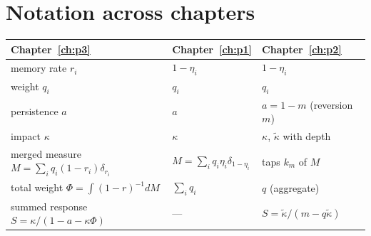 \section{Notation across chapters}

\begin{longtable}{p{}p{}p{}}
\toprule
Chapter~\ref{ch:p3} & Chapter~\ref{ch:p1} & Chapter~\ref{ch:p2}\\
\midrule
memory rate $r_i$ & $1-\eta_i$ & $1-\eta_i$\\
weight $q_i$ & $q_i$ & $q_i$\\
persistence $a$ & $a$ & $a=1-m$ (reversion $m$)\\
impact $\kappa$ & $\kappa$ & $\kappa$, $\tilde\kappa$ with depth\\
merged measure $M=\sum_iq_i(1-r_i)\delta_{r_i}$ & $M=\sum_iq_i\eta_i\delta_{1-\eta_i}$ & taps $k_m$ of $M$\\
total weight $\Phi=\int(1-r)^{-1}dM$ & $\sum_iq_i$ & $q$ (aggregate)\\
summed response $S=\kappa/(1-a-\kappa\Phi)$ & --- & $S=\tilde\kappa/(m-q\tilde\kappa)$\\
\bottomrule
\end{longtable}

